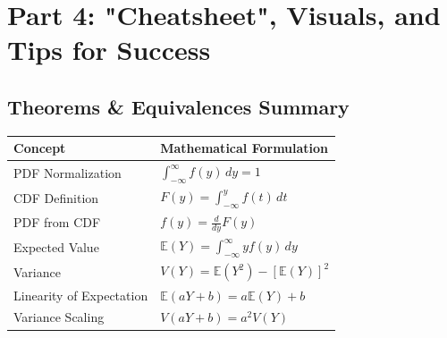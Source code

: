 \documentclass[11pt, a4paper]{article}
\theoremstyle{definition}
\theoremstyle{remark}
\begin{document}
\newpage
\section{Part 4: "Cheatsheet", Visuals, and Tips for Success}

\subsection{Theorems \& Equivalences Summary}
\begin{center}
\renewcommand{\arraystretch}{1.5} 
\begin{tabularx}{\textwidth}{l X}
\toprule
\textbf{Concept} & \textbf{Mathematical Formulation} \\
\midrule
PDF Normalization & $\displaystyle \int_{-\infty}^{\infty} f(y) \, dy = 1$ \\ \addlinespace[2pt]
CDF Definition    & $\displaystyle F(y) = \int_{-\infty}^{y} f(t) \, dt$ \\ \addlinespace[2pt]
PDF from CDF      & $\displaystyle f(y) = \frac{d}{dy} F(y)$ \\ \addlinespace[2pt]
Expected Value    & $\displaystyle \mathbb{E}(Y) = \int_{-\infty}^{\infty} y f(y) \, dy$ \\ \addlinespace[2pt]
Variance          & $\displaystyle V(Y) = \mathbb{E}(Y^2) - [\mathbb{E}(Y)]^2$ \\ \addlinespace[2pt]
Linearity of Expectation & $\displaystyle \mathbb{E}(aY + b) = a\mathbb{E}(Y) + b$ \\ \addlinespace[2pt]
Variance Scaling  & $\displaystyle V(aY + b) = a^2 V(Y)$ \\
\bottomrule
\end{tabularx}
\end{center}
\end{document}
